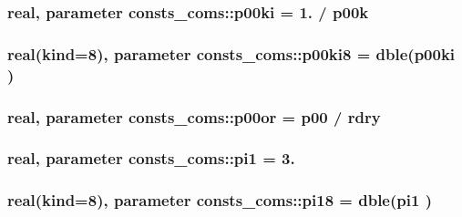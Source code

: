 \subsubsection[{\texorpdfstring{p00ki}{p00ki}}]{\setlength{\rightskip}{0pt plus 5cm}real, parameter consts\+\_\+coms\+::p00ki = 1. / {\bf p00k}}\hypertarget{namespaceconsts__coms_a0bae1605acd44e8d9b1719c378b95acc}{}\label{namespaceconsts__coms_a0bae1605acd44e8d9b1719c378b95acc}
\subsubsection[{\texorpdfstring{p00ki8}{p00ki8}}]{\setlength{\rightskip}{0pt plus 5cm}real(kind=8), parameter consts\+\_\+coms\+::p00ki8 = dble({\bf p00ki} )}\hypertarget{namespaceconsts__coms_a3009dbfe507c1ca30000810af3f59930}{}\label{namespaceconsts__coms_a3009dbfe507c1ca30000810af3f59930}
\subsubsection[{\texorpdfstring{p00or}{p00or}}]{\setlength{\rightskip}{0pt plus 5cm}real, parameter consts\+\_\+coms\+::p00or = {\bf p00} / {\bf rdry}}\hypertarget{namespaceconsts__coms_abd921b7231e57a62b37827f99d586965}{}\label{namespaceconsts__coms_abd921b7231e57a62b37827f99d586965}
\subsubsection[{\texorpdfstring{pi1}{pi1}}]{\setlength{\rightskip}{0pt plus 5cm}real, parameter consts\+\_\+coms\+::pi1 = 3.}\hypertarget{namespaceconsts__coms_ae7b07ddab326c63b9c81a9c607cb79f8}{}\label{namespaceconsts__coms_ae7b07ddab326c63b9c81a9c607cb79f8}
\subsubsection[{\texorpdfstring{pi18}{pi18}}]{\setlength{\rightskip}{0pt plus 5cm}real(kind=8), parameter consts\+\_\+coms\+::pi18 = dble({\bf pi1} )}\hypertarget{namespaceconsts__coms_a5bd1925089f1e1e701a194a3cd46e231}{}\label{namespaceconsts__coms_a5bd1925089f1e1e701a194a3cd46e231}

